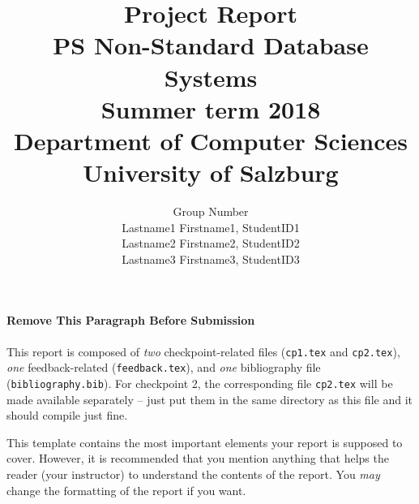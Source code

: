 \documentclass[11pt, onecolumn]{scrartcl}
\title{
  Project Report \\[24pt]
  \normalsize\textbf{
    PS Non-Standard Database Systems \\
    Summer term 2018 \\[12pt]
    Department of Computer Sciences \\
    University of Salzburg}}
\author{
  Group Number \\
  \large Lastname1 Firstname1, StudentID1 \\
  \large Lastname2 Firstname2, StudentID2 \\
  \large Lastname3 Firstname3, StudentID3}
\begin{document}
\maketitle

\paragraph{Remove This Paragraph Before Submission}

This report is composed of \emph{two} checkpoint-related files (\texttt{cp1.tex} and \texttt{cp2.tex}), \emph{one} feedback-related (\texttt{feedback.tex}), and \emph{one} bibliography file (\texttt{bibliography.bib}). For checkpoint 2, the corresponding file \texttt{cp2.tex} will be made available separately -- just put them in the same directory as this file and it should compile just fine.

This template contains the most important elements your report is supposed to cover. However, it is recommended that you mention anything that helps the reader (your instructor) to understand the contents of the report. You \emph{may} change the formatting of the report if you want.





\end{document}
